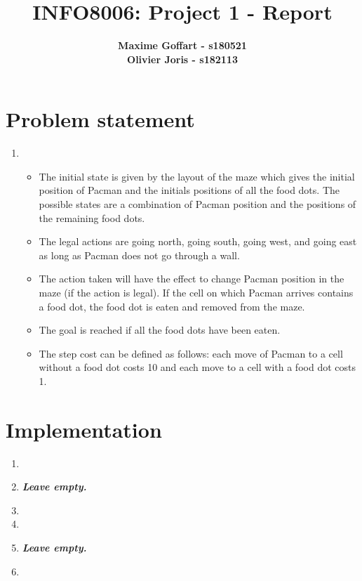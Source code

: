 \documentclass{article}
\begin{document}

\title{\Large{INFO8006: Project 1 - Report}}
\vspace{1cm}
\author{\small{\bf Maxime Goffart - s180521} \\ \small{\bf Olivier Joris - s182113}}

\maketitle


\section{Problem statement}

\begin{enumerate}[label=\alph*.,leftmargin=1.35em]
    \item
    	\begin{itemize}
    		\item The initial state is given by the layout of the maze which gives the initial position of Pacman and the initials positions of all the food dots. The possible states are a combination of Pacman position and the positions of the remaining food dots.
    		\item The legal actions are going north, going south, going west, and going east as long as Pacman does not go through a wall.
    		\item The action taken will have the effect to change Pacman position in the maze (if the action is legal). If the cell on which Pacman arrives contains a food dot, the food dot is eaten and removed from the maze.
    		\item The goal is reached if all the food dots have been eaten.
    		\item The step cost can be defined as follows: each move of Pacman to a cell without a food dot costs 10 and each move to a cell with a food dot costs 1.
    	\end{itemize}
\end{enumerate}

\section{Implementation}

\begin{enumerate}[label=\alph*.,leftmargin=1.35em]
    \item
    \item \textbf{{\it Leave empty.}}
    \item
    \item
    \item \textbf{{\it Leave empty.}}
    \item
\end{enumerate}
\end{document}
